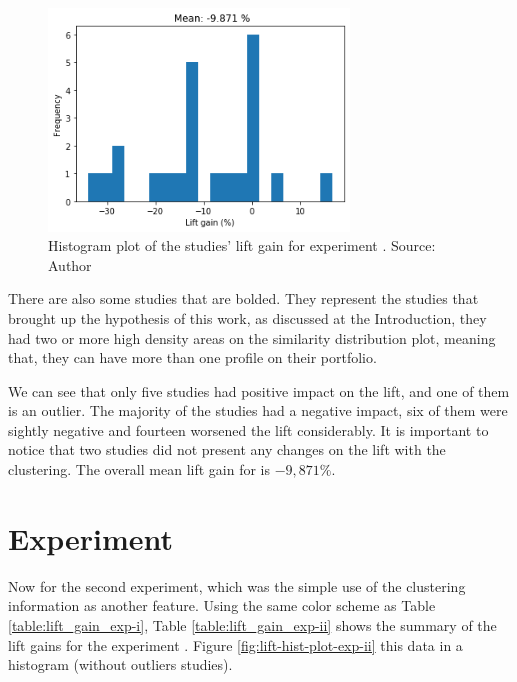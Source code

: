 \begin{figure}[!ht]
   \centering
   \includegraphics[width=8cm]{fig/ch4-lift-hist-plot-exp-i.png}
   \caption{Histogram plot of the studies' lift gain for experiment \nameExperimentI{}. Source: Author}
   \label{fig:lift-hist-plot-exp-i}
\end{figure}

There are also some studies that are bolded. They represent the studies that brought up the hypothesis of this work, as discussed at the Introduction, they had two or more high density areas on the similarity distribution plot, meaning that, they can have more than one profile on their portfolio.

We can see that only five studies had positive impact on the lift, and one of them is an outlier. The majority of the studies had a negative impact, six of them were sightly negative and fourteen worsened the lift considerably. It is important to notice that two studies did not present any changes on the lift with the clustering. The overall mean lift gain for \nameExperimentI{} is $-9,871 \%$.


\section{Experiment \nameExperimentII{}}

Now for the second experiment, which was the simple use of the clustering information as another feature. Using the same color scheme as Table \ref{table:lift_gain_exp-i}, Table \ref{table:lift_gain_exp-ii} shows the summary of the lift gains for the experiment \nameExperimentII{}. Figure \ref{fig:lift-hist-plot-exp-ii} this data in a histogram (without outliers studies).

